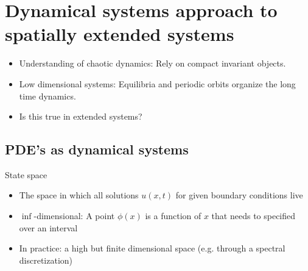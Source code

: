 \documentclass{beamer}
\begin{document}
\section[Dynamicist's view of turbulence]{Dynamical systems approach to spatially extended systems}

\begin{frame}{}
 \begin{itemize}
  \item Understanding of chaotic dynamics: Rely on compact invariant objects.
  \item Low dimensional systems: Equilibria and periodic orbits organize the long time dynamics.
  \item Is this true in extended systems?
 \end{itemize}

\end{frame}





\subsection{PDE's as dynamical systems}

\begin{frame}

\begin{block}{State space}
 \begin{itemize}
	\item The space in which all solutions $u(x,t)$ for given boundary conditions live
	\item $\inf$-dimensional: A point $\phi(x)$ is a function of $x$ that needs to specified
		over an interval
	\item In practice: a high but finite dimensional space (e.g. through a spectral discretization)
 \end{itemize}
\end{block}

\end{frame}
\end{document}
